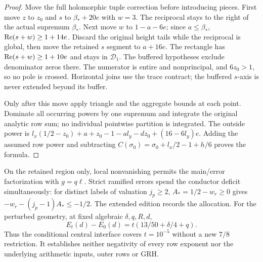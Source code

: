 \begin{proof}
Move the full holomorphic tuple correction before introducing pieces.
First move $z$ to $z_0$ and $s$ to $\beta_*+20e$ with $w=3$.
The reciprocal stays to the right of the actual supremum $\beta_*$.
Next move $w$ to $1-a-6e$; since $a\le\beta_*$,
$\operatorname{Re}(s+w)\ge1+14e$. Discard the original height tails while the
reciprocal is global, then move the retained $s$ segment to $a+16e$.
The rectangle has $\operatorname{Re}(s+w)\ge1+10e$ and stays in $\mathcal D_1$.
The buffered hypotheses exclude denominator zeros there. The numerator
is entire and nonprincipal, and $6z_0>1$, so no pole is crossed.
Horizontal joins use the trace contract; the buffered $s$-axis is
never extended beyond its buffer.

Only after this move apply triangle and the aggregate bounds at each
point. Dominate all occurring powers by one supremum and integrate the
original analytic row sum; no individual pointwise partition is integrated.
The outside power is
$l_x(1/2-z_0)+a+z_0-1-a l_y-dz_0+(16-6l_y)e$.
Adding the assumed row power and subtracting
$C(\sigma_0)=\sigma_0+l_x/2-1+h/6$ proves the formula.
\end{proof}

On the retained region only, local nonvanishing permits the main/error
factorization with $g=q\ell$. Strict ramified errors spend the conductor
deficit simultaneously: for distinct labels of valuation $j_p\ge2$,
$A_*=1/2-w_r\ge0$ gives
$-w_r-(j_p-1)A_*\le-1/2$. The extended edition records the allocation.
For the perturbed geometry, at fixed algebraic $\delta,q,R,d$,
\[
 E_t(d)-E_0(d)=t(13/50+\delta/4+q).
\]
Thus the conditional central interface covers $t=10^{-5}$ without a new
$7/8$ restriction. It establishes neither negativity of every row
exponent nor the underlying arithmetic inputs, outer rows or GRH.


